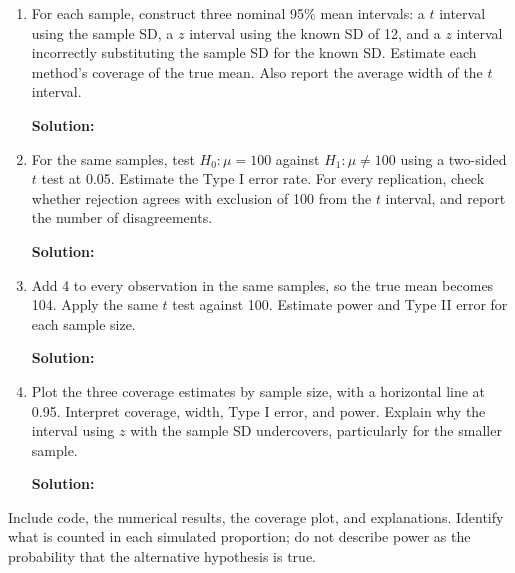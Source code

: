 \documentclass[11pt]{article}
\newcommand{\solution}{\par\medskip\noindent\textbf{Solution:}\par\vspace{0cm}}
\begin{document}
\begin{enumerate}[label=\textbf{(\alph*)}]
  \item For each sample, construct three nominal 95\% mean intervals: a $t$ interval using the sample SD, a $z$ interval using the known SD of 12, and a $z$ interval incorrectly substituting the sample SD for the known SD. Estimate each method's coverage of the true mean. Also report the average width of the $t$ interval.
  \solution

  \item For the same samples, test $H_0: \mu = 100$ against $H_1: \mu \neq 100$ using a two-sided $t$ test at 0.05. Estimate the Type I error rate. For every replication, check whether rejection agrees with exclusion of 100 from the $t$ interval, and report the number of disagreements.
  \solution

  \item Add 4 to every observation in the same samples, so the true mean becomes 104. Apply the same $t$ test against 100. Estimate power and Type II error for each sample size.
  \solution

  \item Plot the three coverage estimates by sample size, with a horizontal line at 0.95. Interpret coverage, width, Type I error, and power. Explain why the interval using $z$ with the sample SD undercovers, particularly for the smaller sample.
  \solution
\end{enumerate}

Include code, the numerical results, the coverage plot, and explanations. Identify what is counted in each simulated proportion; do not describe power as the probability that the alternative hypothesis is true.
\end{document}
